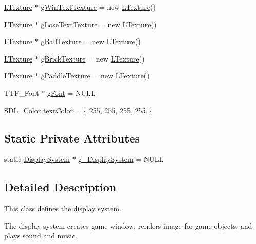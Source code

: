 \begin{DoxyCompactItemize}
\item 
\mbox{\hyperlink{class_l_texture}{L\+Texture}} $\ast$ \mbox{\hyperlink{class_display_system_a2e7e8e02d705d328d3f18fbb59c6854b}{g\+Win\+Text\+Texture}} = new \mbox{\hyperlink{class_l_texture}{L\+Texture}}()
\item 
\mbox{\hyperlink{class_l_texture}{L\+Texture}} $\ast$ \mbox{\hyperlink{class_display_system_a6899d775094d7a852159b553b0308107}{g\+Lose\+Text\+Texture}} = new \mbox{\hyperlink{class_l_texture}{L\+Texture}}()
\item 
\mbox{\hyperlink{class_l_texture}{L\+Texture}} $\ast$ \mbox{\hyperlink{class_display_system_a0b367181261f49238450c4315c09017d}{g\+Ball\+Texture}} = new \mbox{\hyperlink{class_l_texture}{L\+Texture}}()
\item 
\mbox{\hyperlink{class_l_texture}{L\+Texture}} $\ast$ \mbox{\hyperlink{class_display_system_abefe96fc08fd7db8662710ac343e7b8d}{g\+Brick\+Texture}} = new \mbox{\hyperlink{class_l_texture}{L\+Texture}}()
\item 
\mbox{\hyperlink{class_l_texture}{L\+Texture}} $\ast$ \mbox{\hyperlink{class_display_system_a31387e56d53f6ba62d48529f59c046bc}{g\+Paddle\+Texture}} = new \mbox{\hyperlink{class_l_texture}{L\+Texture}}()
\item 
T\+T\+F\+\_\+\+Font $\ast$ \mbox{\hyperlink{class_display_system_a5f194ced1ef63adc2f2be02926961075}{g\+Font}} = N\+U\+LL
\item 
S\+D\+L\+\_\+\+Color \mbox{\hyperlink{class_display_system_a58485e52d4affab0c01b85f02c7ed3d7}{text\+Color}} = \{ 255, 255, 255, 255 \}
\end{DoxyCompactItemize}
\subsection*{Static Private Attributes}
\begin{DoxyCompactItemize}
\item 
static \mbox{\hyperlink{class_display_system}{Display\+System}} $\ast$ \mbox{\hyperlink{class_display_system_a62f8da3ad38782a017f6bb4c1fb0eed4}{g\+\_\+\+Display\+System}} = N\+U\+LL
\end{DoxyCompactItemize}


\subsection{Detailed Description}
This class defines the display system. 

The display system creates game window, renders image for game objects, and plays sound and music. 

